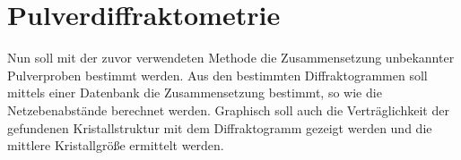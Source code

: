 \section{Pulverdiffraktometrie}
Nun soll mit der zuvor verwendeten Methode die Zusammensetzung unbekannter Pulverproben bestimmt werden. Aus den bestimmten Diffraktogrammen soll mittels einer Datenbank die Zusammensetzung bestimmt, so wie die Netzebenabst\"ande berechnet werden. Graphisch soll auch die Vertr\"aglichkeit der gefundenen Kristallstruktur mit dem Diffraktogramm gezeigt werden und die mittlere Kristallgr\"o\ss e ermittelt werden.
